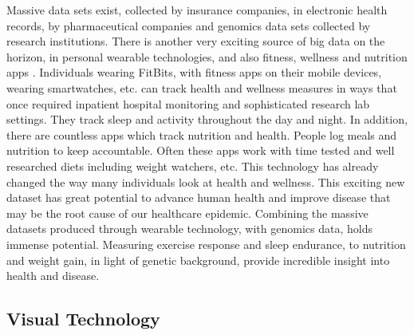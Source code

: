 \documentclass[sigconf]{acmart}
\begin{document}
Massive data sets exist, collected by insurance companies, in
electronic health records, by pharmaceutical companies and genomics data sets collected by research
institutions.  There is another very exciting source of big data on
the horizon, in personal wearable technologies, and also fitness,
wellness and nutrition apps \cite{fox6}.  Individuals wearing FitBits, with
fitness apps on their mobile devices, wearing smartwatches, etc. can
track health and wellness measures in ways that once required
inpatient hospital monitoring and sophisticated research lab settings.
They track sleep and activity throughout the day and night.  In
addition, there are countless apps which track nutrition and health.
People log meals and nutrition to keep accountable.  Often these apps
work with time tested and well researched diets including weight
watchers, etc.  This technology has already changed the way many
individuals look at health and wellness.  This exciting new dataset
has great potential to advance human health and improve disease that
may be the root cause of our healthcare epidemic.  Combining the massive datasets produced through wearable technology, with genomics data, holds immense potential.  Measuring exercise response and sleep endurance, to nutrition and weight gain, in light of genetic background, provide incredible insight into health and disease.  

\subsection{Visual Technology}
\end{document}
